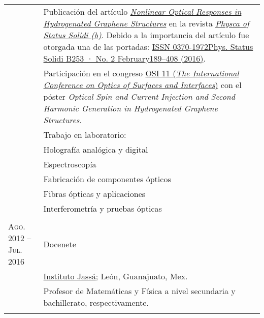 \documentclass[letterpaper,10pt]{article}
\begin{document}
\begin{tabular}{R{4cm}|p{11cm}}
						&	\footnotesize{Publicaci\'on del art\'iculo \emph{\href{http://onlinelibrary.wiley.com/doi/10.1002/pssb.201670511/abstract}{Nonlinear Optical Responses in Hydrogenated Graphene Structures}} en la revista \href{http://onlinelibrary.wiley.com/journal/10.1002/(ISSN)1521-3951}{\emph{Physca of Status Solidi (b)}}. Debido a la importancia del art\'iculo fue otorgada una de las portadas: \href{http://onlinelibrary.wiley.com/doi/10.1002/pssb.201670511/epdf}{ISSN 0370-1972Phys. Status Solidi B253 · No. 2 February189–408 (2016)}.} \\
						&	\footnotesize{Participaci\'on en el congreso \href{http://www.osiconference.org/osi2015/index.php}{OSI 11 (\emph{The International Conference on Optics of Surfaces and Interfaces})} con el p\'oster \emph{Optical Spin and Current Injection and Second Harmonic Generation in Hydrogenated Graphene Structures}.}\\
						&	\footnotesize{Trabajo en laboratorio:}\\
						&	\footnotesize{\qquad Holograf\'ia anal\'ogica y digital}\\
						&	\footnotesize{\qquad Espectroscop\'ia}\\
						&	\footnotesize{\qquad Fabricaci\'on de componentes \'opticos}\\
						&	\footnotesize{\qquad Fibras \'opticas y aplicaciones}\\
						&	\footnotesize{\qquad Interferometr\'ia y pruebas \'opticas}\\
						 \\
\textsc{Ago. 2012 -- Jul. 2016 }	&	Docenete \\
						&	\href{http://www.institutojassa.edu.mx/}{Instituto Jass\'a}; Le\'on, Guanajuato, Mex.\\
						&	\footnotesize{Profesor de Matem\'aticas y F\'isica a nivel secundaria y bachillerato, respectivamente. }\\
						 \\
\end{tabular}
\end{document}
